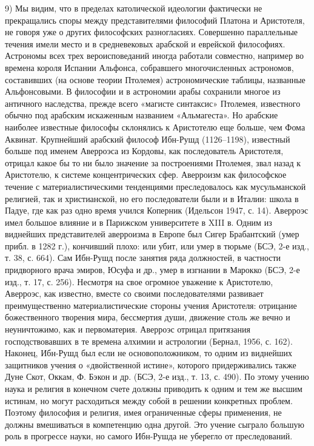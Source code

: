 9)  Мы  видим,  что   в  пределах  католической  идеологии  фактически
не  прекращались  споры  между  представителями  философий  Платона  и
Аристотеля,  не   говоря  уже   о  других   философских  разногласиях.
Совершенно параллельные течения имели место и в средневековых арабской
и  еврейской философиях.  Астрономы всех  трех вероисповеданий  иногда
работали  совместно,  например  во времена  короля  Испании  Альфонса,
собравшего  многочисленных астрономов,  составивших (на  основе теории
Птолемея) астрономические таблицы, названные Альфонсовыми. В философии
и  в  астрономии  арабы  сохранили  многое  из  античного  наследства,
прежде  всего  «магисте  синтаксис» Птолемея,  известного  обычно  под
арабским  искаженным  названием  «Альмагеста».  Но  арабские  наиболее
известные  философы  склонялись  к  Аристотелю еще  больше,  чем  Фома
Аквинат. Крупнейший арабский  философ Ибн-Рушд (1126--1198), известный
больше под именем Аверроэса  из Кордовы, как последователь Аристотеля,
отрицал какое  бы то ни  было значение за построениями  Птолемея, звал
назад  к Аристотелю,  к  системе концентрических  сфер. Аверроизм  как
философское течение  с материалистическими  тенденциями преследовалось
как мусульманской  религией, так и христианской,  но его последователи
были  и  в Италии:  школа  в  Падуе, где  как  раз  одно время  учился
Коперник (Идельсон  1947, с.  14). Аверроэс имел  большое влияние  и в
Парижском  университете в  XIII в.  Одним из  виднейших представителей
аверроизма в  Европе был  Сигер Брабантский (умер  прибл. в  1282 г.),
кончивший  плохо:  или  убит,  или  умер  в  тюрьме  (БСЭ,  2-е  изд.,
т.  38,  с.  664).  Сам  Ибн-Рушд после  занятия  ряда  должностей,  в
частности придворного  врача эмиров,  Юсуфа и др.,  умер в  изгнании в
Марокко (БСЭ,  2-е изд.,  т. 17,  с. 256).  Несмотря на  свое огромное
уважение  к  Аристотелю,  Аверроэс,  как известно,  вместе  со  своими
последователями  развивает преимущественно  материалистические стороны
учения Аристотеля:  отрицание божественного творения  мира, бессмертия
души,  движение столь  же вечно  и неуничтожимо,  как и  первоматерия.
Аверроэс  отрицал притязания  господствовавших  в  те времена  алхимии
и  астрологии  (Бернал, 1956,  с.  162).  Наконец, Ибн-Рушд  был  если
не  основоположником,  то  одним  из  виднейших  защитников  учения  о
«двойственной истине», которого придерживались также Дуне Скот, Оккам,
Ф.  Бэкон и  др. (БСЭ,  2-е  изд., т.  13,  с. 490).  По этому  учению
наука  и религия  в  конечном счете  должны приводить  к  одним и  тем
же  высшим  истинам,  но  могут  расходиться  между  собой  в  решении
конкретных  проблем. Поэтому  философия и  религия, имея  ограниченные
сферы применения, не должны вмешиваться в компетенцию одна другой. Это
учение сыграло большую роль в  прогрессе науки, но самого Ибн-Рушда не
уберегло от преследований.

